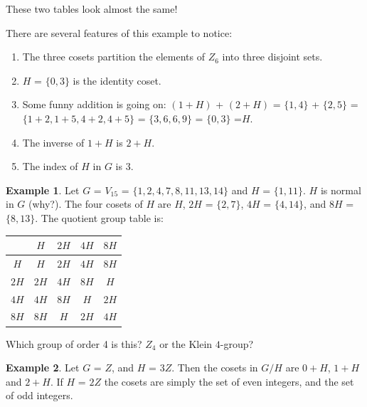 \documentclass[12pt]{article}
\theoremstyle{definition}
\newtheorem{example}{Example}
\begin{document}
    These two tables look almost the same!

    There are several features of this example to notice:
    \begin{enumerate}

    \item
    The three cosets partition the elements of $Z_6$ into three disjoint sets.
    \item
    $H$ = $\{0,3\}$ is the identity coset.

    \item
    Some funny addition is going on: $(1+H)$ + $(2+H)$ = $\{1,4\}$ + $\{2,5\}$ = $\{1+2,1+5,4+2,4+5\}$ = $\{3,6,6,9\}$ = $\{0,3\}$ =$H$.

    \item
    The inverse of $1+H$ is $2+H$.
    \item
    The index of $H$ in $G$ is $3$.
    \end{enumerate}


\begin{example}  Let $G$ = $V_{15}$ = $\{1,2,4,7,8,11,13,14\}$ and $H$ =  $\{1,11\}$. $H$ is normal in $G$ (why?). The four cosets of $H$ are $H$, $2H$ = $\{2,7\}$,  $4H$ = $\{4,14\}$, and  $8H$ =   $\{8,13\}$. The quotient group table is:


    \begin{center}
        \begin{tabular}{c|cccc}
             & $H$ & $2H$ & $4H$ & $8H$  \\ \hline
        $H$  & $H$ & $2H$ & $4H$ & $8H$  \\
        $2H$ & $2H$ & $4H$ & $8H$ & $H$  \\
        $4H$ & $4H$ & $8H$ & $H$ & $2H$  \\
        $8H$ & $8H$ & $H$ & $2H$ & $4H$
        \end{tabular}
    \end{center}


    Which group of order 4 is this? $Z_4$ or the Klein $4$-group?

\end{example}


\begin{example}

Let $G$ = $Z$, and $H$ = $3Z$. Then the cosets in $G/H$ are $0+H$, $1+H$ and $2+H$. If $H$ = $2Z$ the cosets are simply the set of even integers, and the set of odd integers.

\end{example}
\end{document}
